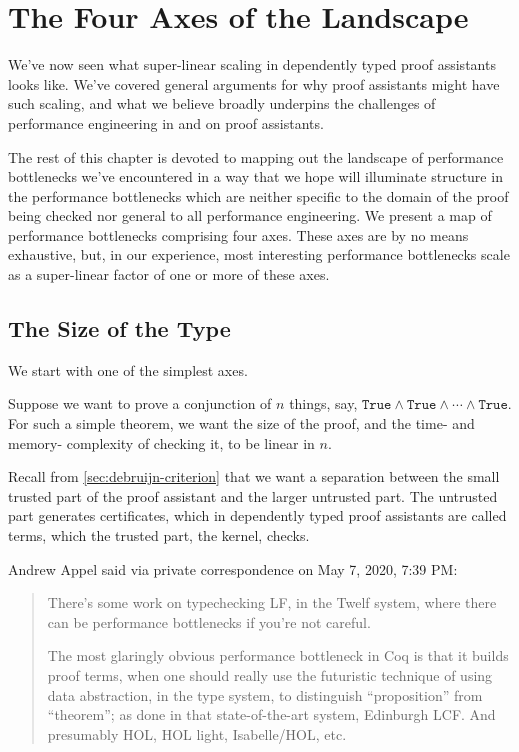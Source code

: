 \section{The Four Axes of the Landscape}\label{sec:perf-axes}

We've now seen what super-linear scaling in dependently typed proof assistants looks like.
We've covered general arguments for why proof assistants might have such scaling, and what we believe broadly underpins the challenges of performance engineering in and on proof assistants.

The rest of this chapter is devoted to mapping out the landscape of performance bottlenecks we've encountered in a way that we hope will illuminate structure in the performance bottlenecks which are neither specific to the domain of the proof being checked nor general to all performance engineering.
We present a map of performance bottlenecks comprising four axes.
These axes are by no means exhaustive, but, in our experience, most interesting performance bottlenecks scale as a super-linear factor of one or more of these axes.

\subsection{The Size of the Type} \label{sec:perf-axis:size-of-type}  \label{sec:quadratic-conj-certificate}

We start with one of the simplest axes.

Suppose we want to prove a conjunction of $n$ things, say, $\texttt{True} \wedge \texttt{True} \wedge \cdots \wedge \texttt{True}$.
For such a simple theorem, we want the size of the proof, and the time- and memory- complexity of checking it, to be linear in $n$.

Recall from \autoref{sec:debruijn-criterion} that we want a separation between the small trusted part of the proof assistant and the larger untrusted part.
The untrusted part generates certificates, which in dependently typed proof assistants are called terms, which the trusted part, the kernel, checks.

\begin{minorcomment}
Andrew Appel said via private correspondence on May 7, 2020, 7:39 PM:
\begin{quotation}
There's some work on typechecking LF, in the Twelf system, where there can be performance bottlenecks if you're not careful.

The most glaringly obvious performance bottleneck in Coq is that it builds proof terms, when one should really use the futuristic technique of using data abstraction, in the type system, to distinguish ``proposition'' from ``theorem''; as done in that state-of-the-art system, Edinburgh LCF.  And presumably HOL, HOL light, Isabelle/HOL, etc.
\end{quotation}
\end{minorcomment}

